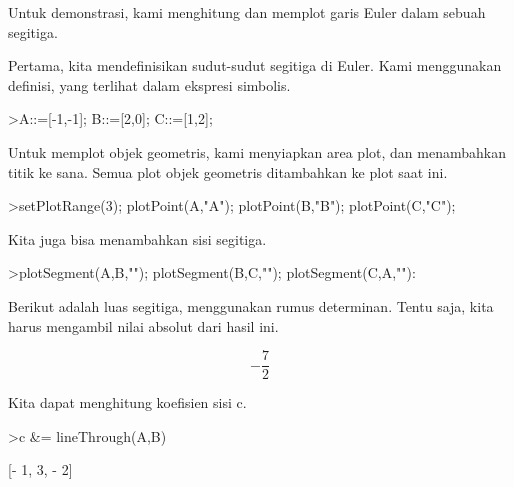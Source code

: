 \documentclass{article}
\begin{document}
\begin{eulernotebook}
\begin{eulercomment}
Untuk demonstrasi, kami menghitung dan memplot garis Euler dalam
sebuah segitiga.

Pertama, kita mendefinisikan sudut-sudut segitiga di Euler. Kami
menggunakan definisi, yang terlihat dalam ekspresi simbolis.
\end{eulercomment}
\begin{eulerprompt}
>A::=[-1,-1]; B::=[2,0]; C::=[1,2];
\end{eulerprompt}
\begin{eulercomment}
Untuk memplot objek geometris, kami menyiapkan area plot, dan
menambahkan titik ke sana. Semua plot objek geometris ditambahkan ke
plot saat ini.
\end{eulercomment}
\begin{eulerprompt}
>setPlotRange(3); plotPoint(A,"A"); plotPoint(B,"B"); plotPoint(C,"C");
\end{eulerprompt}
\begin{eulercomment}
Kita juga bisa menambahkan sisi segitiga.
\end{eulercomment}
\begin{eulerprompt}
>plotSegment(A,B,""); plotSegment(B,C,""); plotSegment(C,A,""):
\end{eulerprompt}
\begin{eulercomment}
Berikut adalah luas segitiga, menggunakan rumus determinan. Tentu
saja, kita harus mengambil nilai absolut dari hasil ini.
\end{eulercomment}
\begin{eulerformula}
\[
-\frac{7}{2}
\]
\end{eulerformula}
\begin{eulercomment}
Kita dapat menghitung koefisien sisi c.
\end{eulercomment}
\begin{eulerprompt}
>c &= lineThrough(A,B)
\end{eulerprompt}
\begin{euleroutput}
  
                              [- 1, 3, - 2]
  

\end{euleroutput}
\end{eulernotebook}
\end{document}
